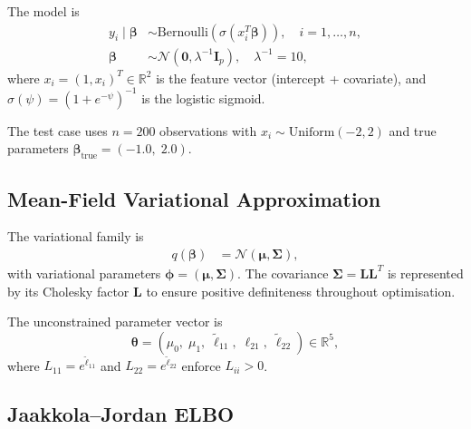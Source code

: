 \documentclass[11pt,a4paper]{article}
\newcommand{\R}{\mathbb{R}}
\newcommand{\N}{\mathcal{N}}
\begin{document}
The model is
\begin{align}
  y_i \mid \bm{\beta} &\sim \mathrm{Bernoulli}(\sigma(x_i^T\bm{\beta})), \quad i=1,\ldots,n,\\
  \bm{\beta} &\sim \N(\bm{0}, \lambda^{-1}\bm{I}_p), \quad \lambda^{-1}=10,
\end{align}
where $x_i = (1, x_i)^T \in \R^2$ is the feature vector (intercept + covariate),
and $\sigma(\psi) = (1+e^{-\psi})^{-1}$ is the logistic sigmoid.

The test case uses $n=200$ observations with $x_i \sim \mathrm{Uniform}(-2,2)$ and
true parameters $\bm{\beta}_{\mathrm{true}} = (-1.0,\; 2.0)$.

\subsection{Mean-Field Variational Approximation}

The variational family is
\begin{align}
  q(\bm{\beta}) &= \N(\bm{\mu}, \bm{\Sigma}),
\end{align}
with variational parameters $\bm{\phi} = (\bm{\mu}, \bm{\Sigma})$.
The covariance $\bm{\Sigma} = \bm{L}\bm{L}^T$ is represented by its Cholesky factor
$\bm{L}$ to ensure positive definiteness throughout optimisation.

The unconstrained parameter vector is
\begin{equation}
  \bm{\theta} = (\mu_0,\; \mu_1,\; \tilde{\ell}_{11},\; \ell_{21},\; \tilde{\ell}_{22})
  \in \R^5,
\end{equation}
where $L_{11} = e^{\tilde{\ell}_{11}}$ and $L_{22} = e^{\tilde{\ell}_{22}}$ enforce
$L_{ii} > 0$.

\subsection{Jaakkola--Jordan ELBO}
\end{document}
